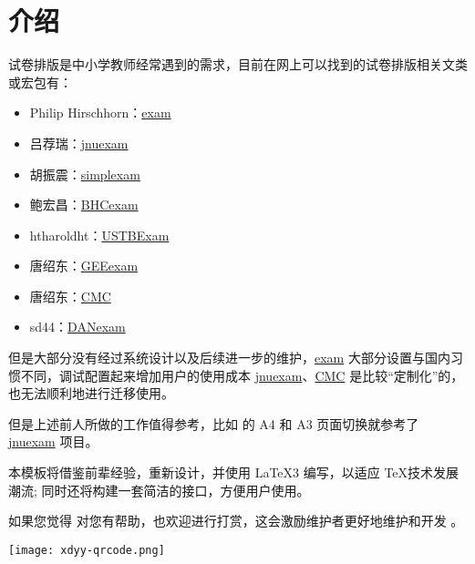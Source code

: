 
\section{介绍}

试卷排版是中小学教师经常遇到的需求，目前在网上可以找到的试卷排版相关文类或宏包有：
\begin{itemize}
  \item Philip Hirschhorn：\href{https://www.ctan.org/pkg/exam}{exam}
  \item 吕荐瑞：\href{https://www.ctan.org/pkg/jnuexam}{jnuexam}
  \item 胡振震：\href{https://github.com/hushidong/simplexam}{simplexam}
  \item 鲍宏昌：\href{https://github.com/mathedu4all/bhcexam}{BHCexam}
  \item htharoldht：\href{https://github.com/htharoldht/USTBExam}{USTBExam}
  \item 唐绍东：\href{https://github.com/shaodongtang/gaokao_exam}{GEEexam}
  \item 唐绍东：\href{https://github.com/shaodongtang/CMC}{CMC}
  \item sd44：\href{https://github.com/sd44/DANexam}{DANexam}
\end{itemize}

但是大部分没有经过系统设计以及后续进一步的维护，\href{https://www.ctan.org/pkg/exam}{exam} 大部分设置与国内习惯不同，调试配置起来增加用户的使用成本 \href{https://www.ctan.org/pkg/jnuexam}{jnuexam}、\href{https://github.com/shaodongtang/CMC}{CMC} 是比较“定制化”的，也无法顺利地进行迁移使用。

但是上述前人所做的工作值得参考，比如  的 A4 和 A3 页面切换就参考了 \href{https://www.ctan.org/pkg/jnuexam}{jnuexam} 项目。

本模板将借鉴前辈经验，重新设计，并使用 \LaTeX3 编写，以适应 \TeX 技术发展潮流; 同时还将构建一套简洁的接口，方便用户使用。

如果您觉得  对您有帮助，也欢迎进行打赏，这会激励维护者更好地维护和开发 。

\begin{center}
  \texttt{[image: xdyy-qrcode.png]}
\end{center}
